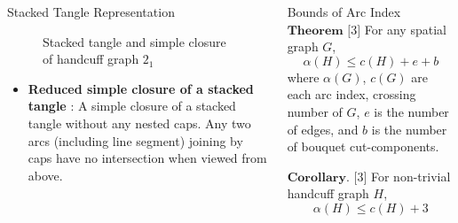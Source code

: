 \documentclass[final]{beamer}
\begin{document}
\begin{frame}[t]
\begin{columns}[t]
\begin{block}{Stacked Tangle Representation}
\begin{figure}
      \caption{Stacked tangle and simple closure of handcuff graph $2_1$}
    \end{figure}
    \begin{itemize}
      \item \textbf{Reduced simple closure of a stacked tangle} : A simple closure of a stacked tangle without any nested caps. Any two arcs (including line segment) joining by caps have no intersection when viewed from above.
    \end{itemize}
  \end{block}

  
  \begin{block}{Bounds of Arc Index}
  $\mathbf{Theorem}$ $[$3$]$ For any spatial graph $G$, 
  \begin{equation*}
    \alpha(H) \leq c(H) + e + b
  \end{equation*}
  where $\alpha (G)$, $c(G)$ are each arc index, crossing number of $G$, $e$ is the number of edges, and $b$ is the number of bouquet cut-components.
  
  $\mathbf{Corollary.}$ $[$3$]$ For non-trivial handcuff graph $H$,
  \begin{equation*}
    \alpha(H) \leq c(H) + 3
  \end{equation*}





\end{block}
\end{columns}
\end{frame}
\end{document}
